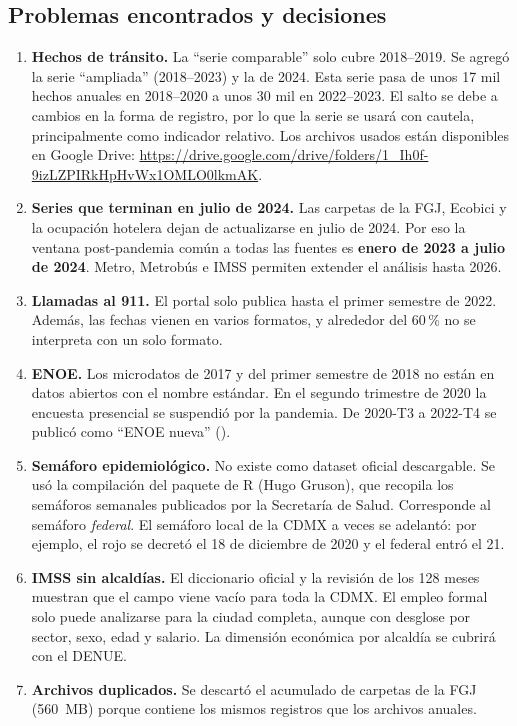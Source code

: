 \subsection{Problemas encontrados y decisiones}
\begin{enumerate}
  \item \textbf{Hechos de tránsito.} La \enquote{serie comparable} solo cubre 2018--2019. Se agregó la
        serie \enquote{ampliada} (2018--2023) y la de 2024. Esta serie pasa de unos 17 mil hechos
        anuales en 2018--2020 a unos 30 mil en 2022--2023. El salto se debe a cambios en la forma de
        registro, por lo que la serie se usará con cautela, principalmente como indicador relativo.
        Los archivos usados están disponibles en Google Drive:
        \url{https://drive.google.com/drive/folders/1_Ih0f-9izLZPIRkHpHvWx1OMLO0lkmAK}.
  \item \textbf{Series que terminan en julio de 2024.} Las carpetas de la FGJ, Ecobici y la
        ocupación hotelera dejan de actualizarse en julio de 2024. Por eso la ventana post-pandemia
        común a todas las fuentes es \textbf{enero de 2023 a julio de 2024}. Metro, Metrobús e IMSS
        permiten extender el análisis hasta 2026.
  \item \textbf{Llamadas al 911.} El portal solo publica hasta el primer semestre de 2022. Además,
        las fechas vienen en varios formatos, y alrededor del 60\,\% no se interpreta con un solo formato.
  \item \textbf{ENOE.} Los microdatos de 2017 y del primer semestre de 2018 no están en datos
        abiertos con el nombre estándar. En el segundo trimestre de 2020 la encuesta presencial se
        suspendió por la pandemia. De 2020-T3 a 2022-T4 se publicó como \enquote{ENOE nueva}
        ().
  \item \textbf{Semáforo epidemiológico.} No existe como dataset oficial descargable. Se usó la
        compilación del paquete de R  (Hugo Gruson), que recopila los semáforos
        semanales publicados por la Secretaría de Salud. Corresponde al semáforo \emph{federal}. El
        semáforo local de la CDMX a veces se adelantó: por ejemplo, el rojo se decretó el 18 de
        diciembre de 2020 y el federal entró el 21.
  \item \textbf{IMSS sin alcaldías.} El diccionario oficial y la revisión de los 128 meses muestran
        que el campo  viene vacío para toda la CDMX. El empleo formal solo puede
        analizarse para la ciudad completa, aunque con desglose por sector, sexo, edad y salario. La
        dimensión económica por alcaldía se cubrirá con el DENUE.
  \item \textbf{Archivos duplicados.} Se descartó el acumulado de carpetas de la FGJ (560~MB) porque
        contiene los mismos registros que los archivos anuales.
\end{enumerate}
